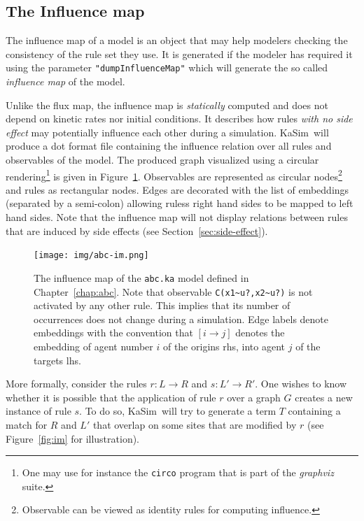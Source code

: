 \documentclass[11pt]{book}
\def\KaSim{\textsf{KaSim}}
\def\intstate{\textasciitilde}
\def\ttt#1{\texttt{#1}}
\def\rar{\rightarrow}
\begin{document}
\subsection{The Influence map}
The influence map of a model is an object that may help modelers checking the consistency of the rule set they use. It is generated if the modeler has required it using the parameter \ttt{"dumpInfluenceMap"} which will generate the so called \emph{influence map} of the model.

Unlike the flux map, the influence map is \emph{statically} computed and does not depend on kinetic rates nor initial conditions. It describes how rules \emph{with no side effect} may potentially influence each other during a simulation. \KaSim~will produce a dot format file containing the influence relation over all rules and observables of the model. The produced graph visualized using a circular rendering\footnote{One may use for instance the \ttt{circo} program that is part of the \textit{graphviz} suite.} is given in Figure~\ref{fig:abc-im}. Observables are represented as circular nodes\footnote{Observable can be viewed as identity rules for computing influence.} and rules as rectangular nodes. Edges are decorated with the list of embeddings (separated by a semi-colon) allowing rules{\textquotesingle}s right hand sides to be mapped to left hand sides. Note that the influence map will not display relations between rules that are induced by side effects (see Section~\ref{sec:side-effect}).

\begin{figure}[htbp] %
   \centering
   \texttt{[image: img/abc-im.png]} 
   \caption{The influence map of the \ttt{abc.ka} model defined in Chapter~\ref{chap:abc}. Note that observable \ttt{C(x1\intstate u?,x2\intstate u?)} is not activated by any other rule. This implies that its number of occurrences does not change during a simulation. Edge labels denote embeddings with the convention that $[i\rar j]$ denotes the embedding of agent number $i$ of the origin{\textquotesingle}s rhs, into agent $j$ of the target{\textquotesingle}s lhs.}
   \label{fig:abc-im}
\end{figure}

More formally, consider the rules $r:L\rar R$ and $s:L'\rar R'$. One wishes to know whether it is possible that the application of rule $r$ over a graph $G$ creates a new instance of rule $s$. To do so, \KaSim~will try to generate a term $T$ containing a match for $R$ and $L'$ that overlap on some sites that are modified by $r$ (see Figure~\ref{fig:im} for illustration).
\end{document}
